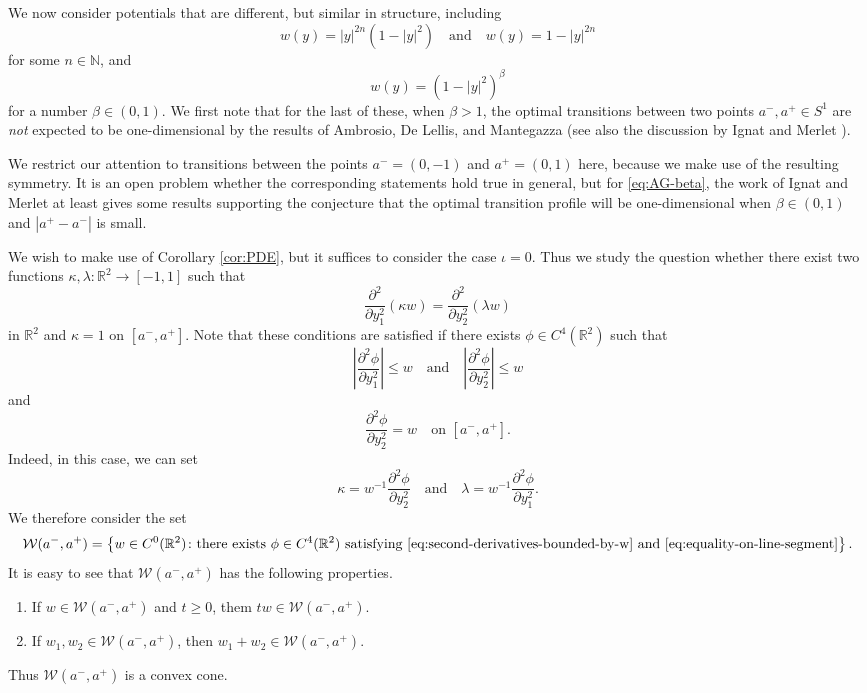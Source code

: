 \documentclass[a4paper]{article}
\newcommand{\R}{\mathbb{R}}
\newcommand{\N}{\mathbb{N}}
\newcommand{\set}[2]{\left\{ #1 \colon #2 \right\}}
\theoremstyle{definition}
\theoremstyle{remark}
\begin{document}
We now consider potentials that are different, but similar in structure, including
\[
w(y) = |y|^{2n}(1 - |y|^2) \quad \text{and} \quad w(y) = 1 - |y|^{2n}
\]
for some $n \in \N$, and
\begin{equation} \label{eq:AG-beta}
w(y) = (1 - |y|^2)^\beta
\end{equation}
for a number $\beta \in (0, 1)$. We first note that for the last of these, when $\beta > 1$, the optimal transitions between
two points $a^-, a^+ \in S^1$ are \emph{not} expected to be one-dimensional by the results of
Ambrosio, De Lellis, and Mantegazza \cite{Ambrosio-DeLellis-Mantegazza:99} (see also the
discussion by Ignat and Merlet \cite{Ignat-Merlet:12}).

We restrict our attention
to transitions between the points $a^- = (0, -1)$ and $a^+ = (0, 1)$ here, because we make use
of the resulting symmetry. It is an open problem whether the corresponding statements hold
true in general, but for \eqref{eq:AG-beta}, the work of Ignat and Merlet \cite{Ignat-Merlet:12} at least
gives some results supporting the conjecture that the optimal transition profile will be one-dimensional
when $\beta \in (0, 1)$ and $|a^+ - a^-|$ is small.

We wish to make use of Corollary \ref{cor:PDE}, but it suffices to consider the case $\iota = 0$.
Thus we study the question whether there exist two functions $\kappa, \lambda \colon \R^2 \to [-1, 1]$
such that
\[
\frac{\partial^2}{\partial y_1^2}(\kappa w) = \frac{\partial^2}{\partial y_2^2}(\lambda w)
\]
in $\R^2$ and $\kappa = 1$ on $[a^-, a^+]$. Note that these conditions are satisfied if there exists $\phi \in C^4(\R^2)$
such that
\begin{equation} \label{eq:second-derivatives-bounded-by-w}
\left|\frac{\partial^2 \phi}{\partial y_1^2}\right| \le w \quad \text{and} \quad \left|\frac{\partial^2 \phi}{\partial y_2^2}\right| \le w
\end{equation}
and
\begin{equation} \label{eq:equality-on-line-segment}
\frac{\partial^2 \phi}{\partial y_2^2} = w \quad \text{on $[a^-, a^+]$}.
\end{equation}
Indeed, in this case, we can set
\[
\kappa = w^{-1} \frac{\partial^2 \phi}{\partial y_2^2} \quad \text{and} \quad \lambda = w^{-1} \frac{\partial^2 \phi}{\partial y_1^2}.
\]
We therefore consider the set
\[
\mathcal{W}(a^-, a^+) = \set{w \in C^0(\R^2)}{\text{there exists } \phi \in C^4(\R^2) \text{ satisfying \eqref{eq:second-derivatives-bounded-by-w} and \eqref{eq:equality-on-line-segment}}}.
\]
It is easy to see that $\mathcal{W}(a^-, a^+)$ has the following properties.
\begin{enumerate}
\item If $w \in \mathcal{W}(a^-, a^+)$ and $t \ge 0$, them $tw \in \mathcal{W}(a^-, a^+)$.
\item If $w_1, w_2 \in \mathcal{W}(a^-, a^+)$, then $w_1 + w_2 \in \mathcal{W}(a^-, a^+)$.
\end{enumerate}
Thus $\mathcal{W}(a^-, a^+)$ is a convex cone.
\end{document}
